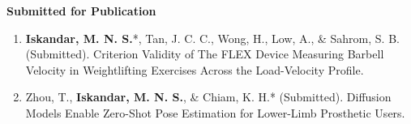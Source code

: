 \documentclass[../main.tex]{subfiles}
\begin{document}
            
        
        \textbf{Submitted for Publication}
        \def\labelprefix{S}
        \begin{enumerate}            
            \item\label{article: fyp}{\textbf{Iskandar, M. N. S.}*, Tan, J. C. C., Wong, H., Low, A., \& Sahrom, S. B. (Submitted). Criterion Validity of The FLEX Device Measuring Barbell Velocity in Weightlifting Exercises Across the Load-Velocity Profile.}
            
            \item\label{article: diffusion_openpose}{Zhou, T., \textbf{Iskandar, M. N. S.}, \& Chiam, K. H.* (Submitted). Diffusion Models Enable Zero-Shot Pose Estimation for Lower-Limb Prosthetic Users.}
        \end{enumerate}

        
  \resumeSubHeadingListEnd
\end{document}
